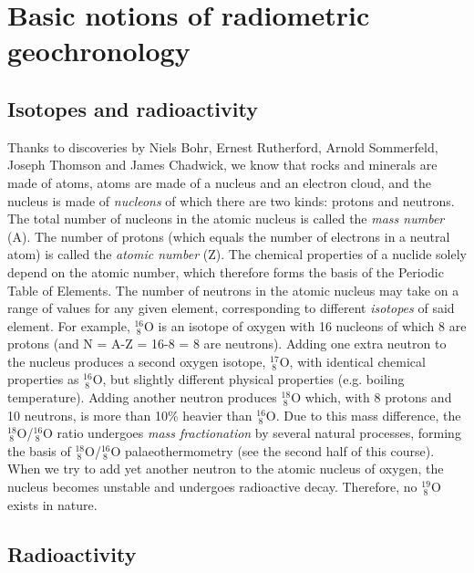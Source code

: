 \chapter[Basic Notions]{Basic notions of radiometric geochronology}
\label{ch:basic-notions}

\section{Isotopes and radioactivity}
\label{sec:isotopes}

Thanks to discoveries by Niels Bohr, Ernest Rutherford, Arnold
Sommerfeld, Joseph Thomson and James Chadwick, we know that rocks and
minerals are made of atoms, atoms are made of a nucleus and an
electron cloud, and the nucleus is made of \emph{nucleons} of which
there are two kinds: protons and neutrons. The total number of
nucleons in the atomic nucleus is called the \emph{mass number}
(A). The number of protons (which equals the number of electrons in a
neutral atom) is called the \emph{atomic number} (Z). The chemical
properties of a nuclide solely depend on the atomic number, which
therefore forms the basis of the Periodic Table of Elements. The
number of neutrons in the atomic nucleus may take on a range of values
for any given element, corresponding to different \emph{isotopes} of
said element. For example, $^{16}_{~8}$O is an isotope of oxygen with
16 nucleons of which 8 are protons (and N = A-Z = 16-8 = 8 are
neutrons). Adding one extra neutron to the nucleus produces a second
oxygen isotope, $^{17}_{~8}$O, with identical chemical properties as
$^{16}_{~8}$O, but slightly different physical properties
(e.g. boiling temperature).  Adding another neutron produces
$^{18}_{~8}$O which, with 8 protons and 10 neutrons, is more than 10\%
heavier than $^{16}_{~8}$O. Due to this mass difference, the
$^{18}_{~8}$O/$^{16}_{~8}$O ratio undergoes \emph{mass fractionation}
by several natural processes, forming the basis of
$^{18}_{~8}$O/$^{16}_{~8}$O palaeothermometry (see the second half of
this course). When we try to add yet another neutron to the atomic
nucleus of oxygen, the nucleus becomes unstable and undergoes
radioactive decay.  Therefore, no $^{19}_{~8}$O exists in nature.

\section{Radioactivity}
\label{sec:radioactivity}

